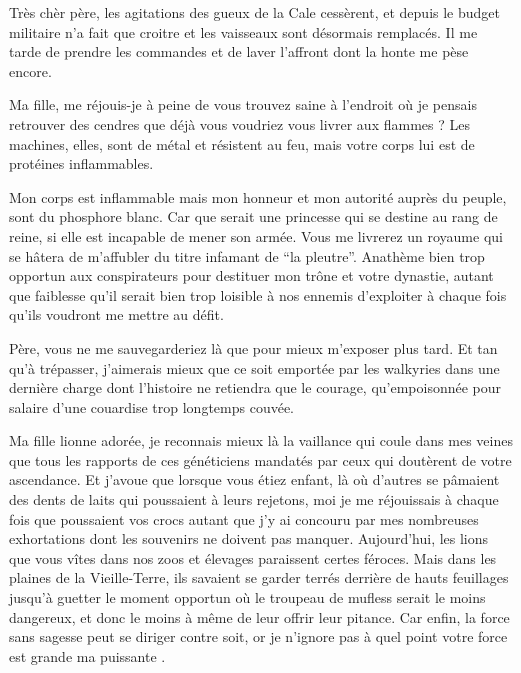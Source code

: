 \scene

\StageDirII{\ela, \roi}




\begin{drama}
  \elaspeaks  Très chèr père, les agitations des gueux de la Cale cessèrent, et depuis le budget militaire n’a fait que croitre et les vaisseaux sont désormais remplacés. Il me tarde de prendre les commandes et de laver l’affront dont la honte me pèse encore.

  \roispeaks  Ma fille, me réjouis-je à peine de vous trouvez saine à l’endroit où je pensais retrouver des cendres que déjà vous voudriez vous livrer aux flammes ? Les machines, elles, sont de métal et résistent au feu, mais votre corps lui est de protéines inflammables.

  \elaspeaks Mon corps est inflammable mais mon honneur et mon autorité auprès du peuple, sont du phosphore blanc. Car que serait une princesse qui se destine au rang de reine, si elle est incapable de mener son armée. Vous me livrerez un royaume qui se hâtera de m’affubler du titre infamant de \enquote{\princesse la pleutre}. Anathème  bien trop opportun aux conspirateurs pour destituer mon trône et votre dynastie, autant que faiblesse qu’il serait bien trop loisible à nos ennemis d’exploiter à chaque fois qu’ils voudront me mettre au défit.

  Père, vous ne me sauvegarderiez là que pour mieux m’exposer plus tard. Et tan qu’à trépasser, j’aimerais mieux que ce soit emportée par les walkyries dans une dernière charge dont l’histoire ne retiendra que le courage, qu’empoisonnée pour salaire d’une couardise trop longtemps  couvée.

  \roispeaks  Ma fille lionne adorée, je reconnais mieux là la vaillance qui coule dans mes veines que tous les rapports de ces généticiens mandatés par ceux qui doutèrent de votre ascendance. Et j’avoue que lorsque vous étiez enfant, là où d’autres se pâmaient des dents de laits qui poussaient à leurs rejetons, moi je me réjouissais à chaque fois que poussaient vos crocs autant que j’y ai concouru par mes nombreuses exhortations dont les souvenirs ne doivent pas manquer. Aujourd’hui, les lions que vous vîtes dans nos zoos et élevages paraissent certes féroces. Mais dans les plaines de la Vieille-Terre, ils savaient se garder terrés derrière de hauts feuillages jusqu’à guetter le moment opportun où le troupeau de mufless serait le moins dangereux, et donc le moins à même de leur offrir leur pitance. Car enfin, la force sans sagesse peut se diriger contre soit, or je n’ignore pas à quel point votre force est grande ma puissante \princesse{}.


\end{drama}
